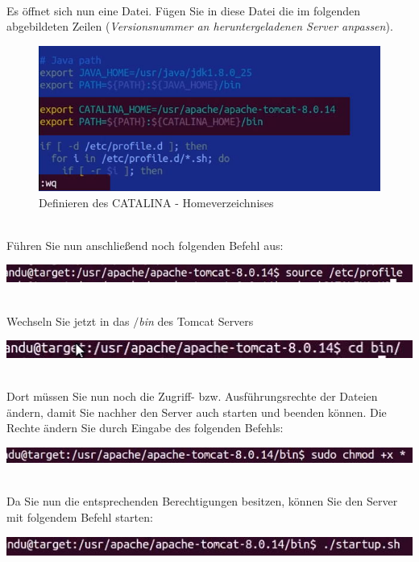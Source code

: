 \documentclass[a4paper, 12pt]{scrreprt}
\begin{document}
\newpage
\ \\
Es öffnet sich nun eine Datei. Fügen Sie in diese Datei die im folgenden abgebildeten Zeilen ({\it Versionsnummer an heruntergeladenen Server anpassen}).
\begin{figure}[h]
\centering
\includegraphics[width=0.7\linewidth]{Grafiken/Catalina_Home}
\caption{Definieren des CATALINA - Homeverzeichnises}
\label{fig:Catalina_Home}
\end{figure}
\ \\
Führen Sie nun anschließend noch folgenden Befehl aus:
\begin{center}
\includegraphics[width=0.8\linewidth]{Grafiken/Befehl_idonKnow}
\end{center}
\ \\
Wechseln Sie jetzt in das {\it$/$bin} des Tomcat Servers
\begin{center}
\includegraphics[width=0.7\linewidth]{Grafiken/Bin_direct}
\end{center}
\ \\
Dort müssen Sie nun noch die Zugriff- bzw. Ausführungsrechte der Dateien ändern, damit Sie nachher den Server auch starten und beenden können. Die Rechte ändern Sie durch Eingabe des folgenden Befehls:
\begin{center}
\includegraphics[width=0.8\linewidth]{Grafiken/rechte}
\end{center}
\ \\
Da Sie nun die entsprechenden Berechtigungen besitzen, können Sie den Server mit folgendem Befehl starten:
\begin{center}
\includegraphics[width=0.8\linewidth]{Grafiken/Tomcat_starten_linux}
\end{center}
\end{document}
